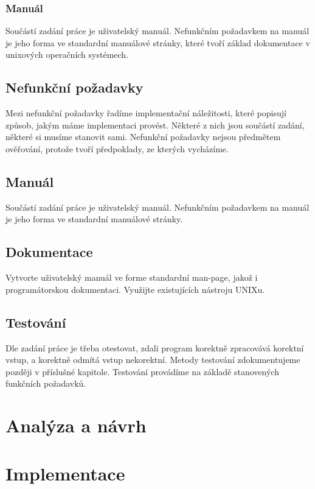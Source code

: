 \documentclass[thesis=B,czech]{FITthesis}[2012/06/26]
\begin{document}
\subsection{Manuál}
Součástí zadání práce je uživatelský manuál. Nefunkčním požadavkem na manuál je jeho forma ve standardní manuálové stránky, které tvoří základ dokumentace v unixových operačních systémech.

\section{Nefunkční požadavky}

Mezi nefunkční požadavky řadíme implementační náležitosti, které popisují způsob, jakým máme implementaci provést. Některé z nich jsou součástí zadání, některé si musíme stanovit sami. Nefunkční požadavky nejsou předmětem ověřování, protože tvoří předpoklady, ze kterých vycházíme.

\section{Manuál}
Součástí zadání práce je uživatelský manuál. Nefunkčním požadavkem na manuál je jeho forma ve standardní manuálové stránky.

\section{Dokumentace}


Vytvorte uživatelský manuál ve forme standardní man-page, jakož i programátorskou dokumentaci.
Využijte existujících nástroju UNIXu.


\section{Testování}
Dle zadání práce je třeba otestovat, zdali program korektně zpracovává korektní vstup, a korektně odmítá vstup nekorektní. Metody testování zdokumentujeme později v příslušné kapitole. Testování provádíme na základě stanovených funkčních požadavků. 

\chapter{Analýza a návrh}

\chapter{Implementace}
\end{document}
